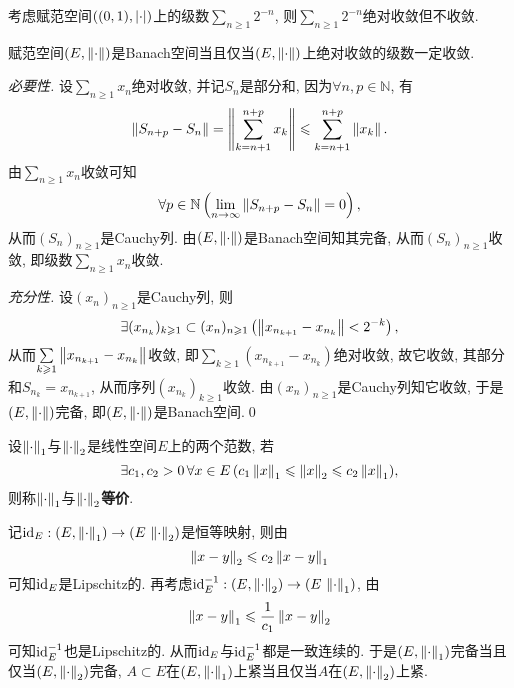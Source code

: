 \begin{Remark}
	考虑赋范空间$ ((0,1),\left| \cdot \right| ) $上的级数$ \sum\limits_{n\geqslant 1}2^{-n} $, 则$ \sum\limits_{n\geqslant 1}2^{-n} $绝对收敛但不收敛.
\end{Remark}

\begin{Theorem}
	赋范空间$ (E,\left\| \cdot \right\|) $是Banach空间当且仅当$ (E,\left\| \cdot \right\|) $上绝对收敛的级数一定收敛.
\end{Theorem}
\begin{Proof}
	\textsl{必要性.} 设$ \sum\limits_{n\geqslant 1}x_n $绝对收敛, 并记$ S_n $是部分和, 因为$ \forall n,p\in\mathbb{N} $, 有
	\[
		\left\| S_{n+p}-S_n \right\|=\left\| \sum_{k=n+1}^{n+p}x_k \right\|\leqslant\sum_{k=n+1}^{n+p}\left\| x_k \right\|.
	\]
	由$ \sum\limits_{n\geqslant 1}x_n $收敛可知
	\[
		\forall p\in\mathbb{N}\left(\lim_{n\to\infty}\left\| S_{n+p}-S_n \right\|=0\right),
	\]
	从而$ (S_n)_{n\geqslant 1} $是Cauchy列. 由$ (E,\left\| \cdot \right\|) $是Banach空间知其完备, 从而$ (S_n)_{n\geqslant 1} $收敛, 即级数$ \sum\limits_{n\geqslant 1}x_n $收敛.

	\textsl{充分性.} 设$ (x_n)_{n\geqslant 1} $是Cauchy列, 则
	\[
		\exists(x_{n_k})_{k\geqslant 1}\subset(x_n)_{n\geqslant 1}\left(\left\| x_{n_{k+1}}-x_{n_k} \right\|<2^{-k}\right),
	\]
	从而$ \sum\limits_{k\geqslant 1}\left\| x_{n_{k+1}}-x_{n_k} \right\| $收敛, 即$ \sum\limits_{k\geqslant 1}(x_{n_{k+1}}-x_{n_k}) $绝对收敛, 故它收敛, 其部分和$ S_{n_k}=x_{n_{k+1}} $, 从而序列$ (x_{n_k})_{k\geqslant 1} $收敛. 由$ (x_n)_{n\geqslant 1} $是Cauchy列知它收敛, 于是$ (E,\left\| \cdot \right\|) $完备, 即$ (E,\left\| \cdot \right\|) $是Banach空间.\qed
\end{Proof}

\begin{Definition}[范数等价]
	设$ \left\| \cdot \right\|_1 $与$ \left\| \cdot \right\|_2 $是线性空间$ E $上的两个范数, 若
	\[
		\exists c_1,c_2>0\,\forall x\in E\,(c_1\left\| x \right\|_1\leqslant\left\| x \right\|_2\leqslant c_2\left\| x \right\|_1),
	\]
	则称$ \left\| \cdot \right\|_1 $与$ \left\| \cdot \right\|_2 $\textbf{等价}.
\end{Definition}

\begin{Remark}
	记$ \mathrm{id}_E : (E,\left\| \cdot \right\|_1)\to(E\,\left\| \cdot \right\|_2) $是恒等映射, 则由
	\[
		\left\| x-y \right\|_2\leqslant c_2\left\| x-y \right\|_1
	\]
	可知$ \mathrm{id}_E $是Lipschitz的. 再考虑$ \mathrm{id}_E^{-1} : (E,\left\| \cdot \right\|_2)\to(E\,\left\| \cdot \right\|_1) $, 由
	\[
		\left\| x-y \right\|_1\leqslant\frac{1}{c_1}\left\| x-y \right\|_2
	\]
	可知$ \mathrm{id}_E^{-1} $也是Lipschitz的. 从而$ \mathrm{id}_E $与$ \mathrm{id}_E^{-1} $都是一致连续的. 于是$ (E,\left\| \cdot \right\|_1) $完备当且仅当$ (E,\left\| \cdot \right\|_2) $完备, $ A\subset E $在$ (E,\left\| \cdot \right\|_1) $上紧当且仅当$ A $在$ (E,\left\| \cdot \right\|_2) $上紧.
\end{Remark}

